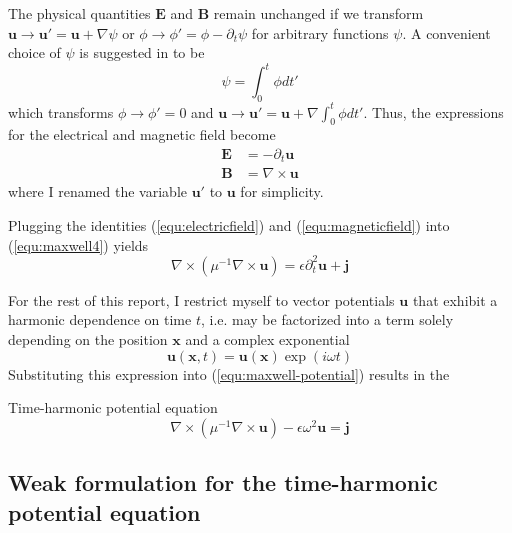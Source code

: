 \documentclass[11pt, a4paper]{article}
\begin{document}
The physical quantities $\mathbf{E}$ and $\mathbf{B}$ remain unchanged 
if we transform $\mathbf{u} \to \mathbf{u}' = \mathbf{u} + \nabla \psi$ or
$\phi \to \phi' = \phi - \partial_t \psi$ for arbitrary functions $\psi$.
A convenient choice of $\psi$ is suggested in \citep{gauge-transformation} to be
\begin{equation}
    \psi = \int_0^t \phi dt' \label{equ:gauge}
\end{equation}
which transforms $\phi \to \phi' = 0$ and $\mathbf{u} \to \mathbf{u}' = \mathbf{u}
+ \nabla \int_0^t \phi dt'$. Thus, the expressions for the electrical and
magnetic field become
\begin{align}
    \mathbf{E} &= -\partial_t \mathbf{u} \label{equ:electricfield} \\
    \mathbf{B} &= \nabla \times \mathbf{u} \label{equ:magneticfield}
\end{align}
where I renamed the variable $\mathbf{u}'$ to $\mathbf{u}$ for simplicity.

Plugging the identities (\ref{equ:electricfield}) and (\ref{equ:magneticfield})
into (\ref{equ:maxwell4}) yields 
\begin{equation}
    \nabla \times (\mu^{-1} \nabla \times \mathbf{u}) =  \epsilon \partial_t^2 \mathbf{u} + \mathbf{j} \label{equ:maxwell-potential}
\end{equation}

For the rest of this report, I restrict myself to vector potentials $\mathbf{u}$
that exhibit a harmonic dependence on time $t$, i.e. may be factorized into
a term solely depending on the position $\mathbf{x}$ and a complex exponential
\begin{equation}
    \mathbf{u}(\mathbf{x}, t) = \mathbf{u}(\mathbf{x}) \exp(i \omega t) \label{equ:time-harmonic}
\end{equation}
Substituting this expression into (\ref{equ:maxwell-potential}) results in the
\begin{fancybox}{Time-harmonic potential equation}
    \begin{equation}
     \nabla \times (\mu^{-1} \nabla \times \mathbf{u}) - \epsilon \omega^2 \mathbf{u} = \mathbf{j} \label{equ:maxwell-timeharmonic}
    \end{equation}
\end{fancybox}

\subsection{Weak formulation for the time-harmonic potential equation}
\label{subsec:maxwell-weak}
\end{document}
